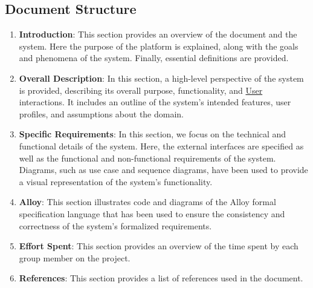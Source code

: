 \subsection{Document Structure}
\begin{enumerate}
    \item \textbf{Introduction}: This section provides an overview of the document and the system. Here the purpose of the platform is explained, along with the goals and phenomena of the system. Finally, essential definitions are provided.
    \item \textbf{Overall Description}: In this section, a high-level perspective of the system is provided, describing its overall purpose, functionality, and \hyperref[def:user]{User} interactions. It includes an outline of the system's intended features, user profiles, and assumptions about the domain.
    \item \textbf{Specific Requirements}: In this section, we focus on the technical and functional details of the system. Here, the external interfaces are specified as well as the functional and non-functional requirements of the system. Diagrams, such as use case and sequence diagrams, have been used to provide a visual representation of the system's functionality.
    \item \textbf{Alloy}: This section illustrates code and diagrams of the Alloy formal specification language that has been used to ensure the consistency and correctness of the system's formalized requirements.
    \item \textbf{Effort Spent}: This section provides an overview of the time spent by each group member on the project.
    \item \textbf{References}: This section provides a list of references used in the document.
\end{enumerate}